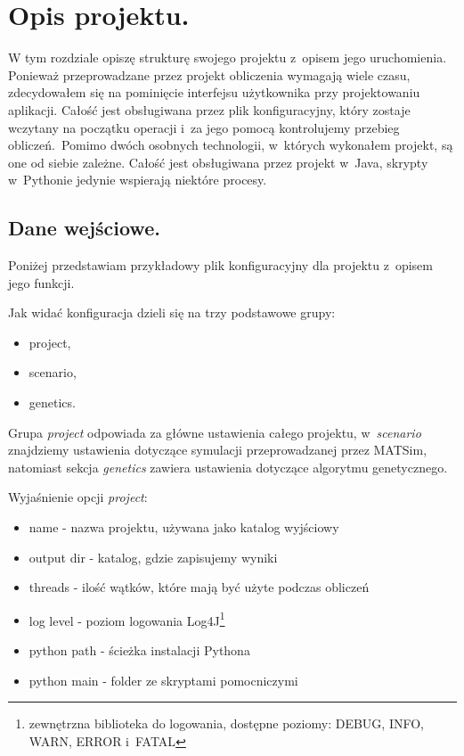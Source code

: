 \documentclass[twoside,12pt]{report}
\let\oldsection\chapter
\def\chapter{\cleardoublepage\oldsection}
\begin{document}
\chapter{Opis projektu.}\label{rozdz.opis} 

W tym rozdziale opiszę strukturę swojego projektu z~opisem jego uruchomienia. Ponieważ przeprowadzane przez projekt obliczenia wymagają wiele czasu, zdecydowałem się na pominięcie interfejsu użytkownika przy projektowaniu aplikacji. Całość jest obsługiwana przez plik konfiguracyjny, który zostaje wczytany na początku operacji i~za jego pomocą kontrolujemy przebieg obliczeń.~Pomimo dwóch osobnych technologii, w~których wykonałem projekt, są one od siebie zależne. Całość jest obsługiwana przez projekt w~Java, skrypty w~Pythonie jedynie wspierają niektóre procesy.

\section{Dane wejściowe.}

Poniżej przedstawiam przykładowy plik konfiguracyjny dla projektu z~opisem jego funkcji.



\vspace*{15px}

Jak widać konfiguracja dzieli się na trzy podstawowe grupy:
\begin{itemize}
\item project,
\item scenario,
\item genetics.
\end{itemize}

\vspace*{15px}

Grupa \textit{project} odpowiada za główne ustawienia całego projektu, w~\textit{scenario} znajdziemy ustawienia dotyczące symulacji przeprowadzanej przez MATSim, natomiast sekcja \textit{genetics} zawiera ustawienia dotyczące algorytmu genetycznego.

\vspace*{15px}

Wyjaśnienie opcji \textit{project}:
\begin{itemize}
\item name - nazwa projektu, używana jako katalog wyjściowy
\item output dir - katalog, gdzie zapisujemy wyniki
\item threads - ilość wątków, które mają być użyte podczas obliczeń
\item log level - poziom logowania Log4J\footnote{zewnętrzna biblioteka do logowania, dostępne poziomy: DEBUG, INFO, WARN, ERROR i~FATAL}
\item python path - ścieżka instalacji Pythona
\item python main - folder ze skryptami pomocniczymi
\end{itemize}
\end{document}
